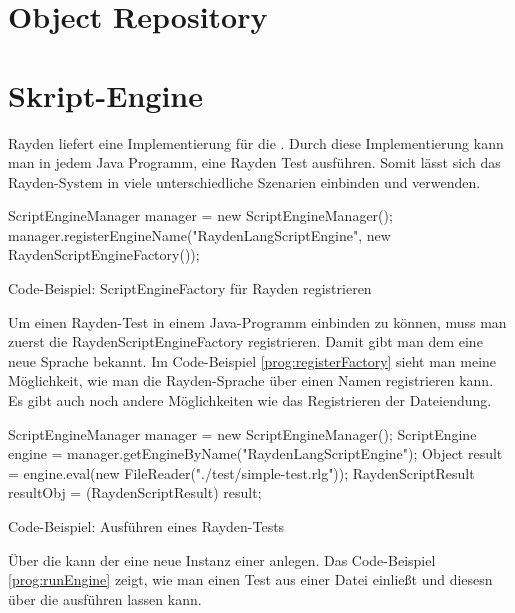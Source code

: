\todo

\section{Object Repository}

\todo


\section{Skript-Engine}

Rayden liefert eine Implementierung für die . Durch diese Implementierung kann man in jedem Java Programm, eine Rayden Test ausführen. Somit lässt sich das Rayden-System in viele unterschiedliche Szenarien einbinden und verwenden. 

\begin{program}
\begin{JavaCode}
ScriptEngineManager manager = new ScriptEngineManager();
manager.registerEngineName("RaydenLangScriptEngine", new RaydenScriptEngineFactory());
\end{JavaCode}
\caption{Code-Beispiel: ScriptEngineFactory für Rayden registrieren}
\label{prog:registerFactory}
\end{program}

\SuperPar
Um einen Rayden-Test in einem Java-Programm einbinden zu können, muss man zuerst die RaydenScriptEngineFactory registrieren. Damit gibt man dem  eine neue Sprache bekannt. Im Code-Beispiel \ref{prog:registerFactory} sieht man meine Möglichkeit, wie man die Rayden-Sprache über einen Namen registrieren kann. Es gibt auch noch andere Möglichkeiten wie das Registrieren der Dateiendung.

\begin{program}
\begin{JavaCode}
ScriptEngineManager manager = new ScriptEngineManager();
ScriptEngine engine = manager.getEngineByName("RaydenLangScriptEngine");
Object result =  engine.eval(new FileReader("./test/simple-test.rlg"));
RaydenScriptResult resultObj = (RaydenScriptResult) result;
\end{JavaCode}
\caption{Code-Beispiel: Ausführen eines Rayden-Tests}
\label{prog:runEngine}
\end{program}

\SuperPar
Über die  kann der  eine neue Instanz einer  anlegen. Das Code-Beispiel \ref{prog:runEngine} zeigt, wie man einen Test aus einer Datei einließt und diesesn über die  ausführen lassen kann.


